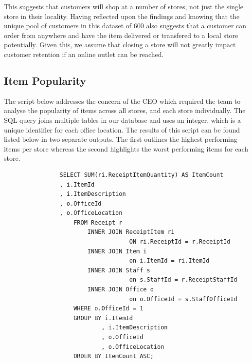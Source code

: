 \documentclass{article}
\begin{document}
            This suggests that customers will shop at a number of stores, not just the single store in their locality. Having reflected upon the findings and knowing that the unique pool of customers in this dataset of 600 also suggests that a customer can order from anywhere and have the item
            delivered or transfered to a local store potentially. Given this, we assume that closing a store will not greatly impact customer retention if an online outlet can be reached.

\newpage

            \subsection{Item Popularity}
            
            The script below addresses the concern of the CEO which required the team to analyse the popularity of items across all stores, and each store individually. The SQL query joins multiple tables in our database and uses an integer, which is a unique identifier for each office location. 
            The results of this script can be found listed below in two separate outputs. The first outlines the highest performing items per store whereas the second highlights the worst performing items for each store. \\

            \begin{lstlisting}
                SELECT SUM(ri.ReceiptItemQuantity) AS ItemCount
                , i.ItemId
                , i.ItemDescription
                , o.OfficeId
                , o.OfficeLocation
                    FROM Receipt r
                        INNER JOIN ReceiptItem ri
                                    ON ri.ReceiptId = r.ReceiptId
                        INNER JOIN Item i
                                    on i.ItemId = ri.ItemId
                        INNER JOIN Staff s
                                    on s.StaffId = r.ReceiptStaffId
                        INNER JOIN Office o
                                    on o.OfficeId = s.StaffOfficeId
                    WHERE o.OfficeId = 1
                    GROUP BY i.ItemId
                            , i.ItemDescription
                            , o.OfficeId
                            , o.OfficeLocation
                    ORDER BY ItemCount ASC;
            \end{lstlisting}
\end{document}
